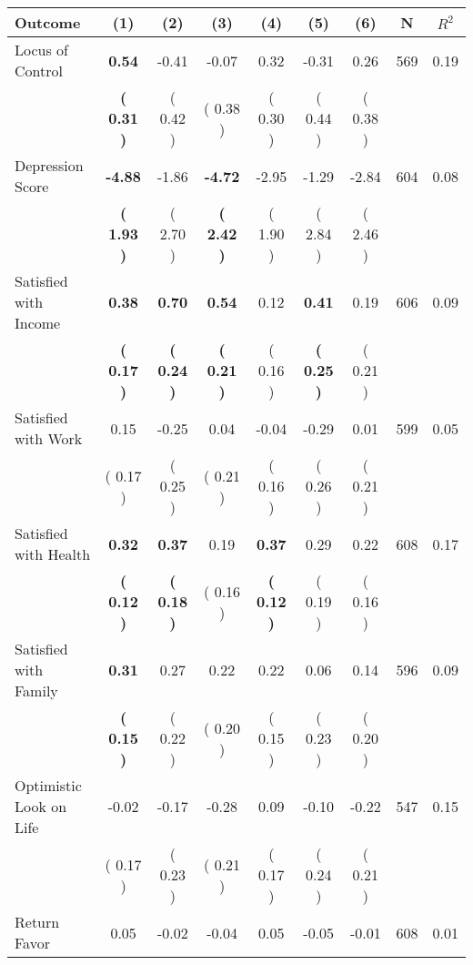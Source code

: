 \begin{tabular}{lcccccccc}
\toprule
 \textbf{Outcome} & \textbf{(1)} & \textbf{(2)} & \textbf{(3)} & \textbf{(4)} & \textbf{(5)} & \textbf{(6)} & \textbf{N} & \textbf{$ R^2$} \\
\midrule
Locus of Control & \textbf{     0.54} &     -0.41 &     -0.07 &      0.32 &     -0.31 &      0.26 & 569 &       0.19 \\ 
 & \textbf{(     0.31 )} & (     0.42 ) & (     0.38 ) & (     0.30 ) & (     0.44 ) & (     0.38 ) & \\
Depression Score & \textbf{    -4.88} &     -1.86 & \textbf{    -4.72} &     -2.95 &     -1.29 &     -2.84 & 604 &       0.08 \\ 
 & \textbf{(     1.93 )} & (     2.70 ) & \textbf{(     2.42 )} & (     1.90 ) & (     2.84 ) & (     2.46 ) & \\
Satisfied with Income & \textbf{     0.38} & \textbf{     0.70} & \textbf{     0.54} &      0.12 & \textbf{     0.41} &      0.19 & 606 &       0.09 \\ 
 & \textbf{(     0.17 )} & \textbf{(     0.24 )} & \textbf{(     0.21 )} & (     0.16 ) & \textbf{(     0.25 )} & (     0.21 ) & \\
Satisfied with Work &      0.15 &     -0.25 &      0.04 &     -0.04 &     -0.29 &      0.01 & 599 &       0.05 \\ 
 & (     0.17 ) & (     0.25 ) & (     0.21 ) & (     0.16 ) & (     0.26 ) & (     0.21 ) & \\
Satisfied with Health & \textbf{     0.32} & \textbf{     0.37} &      0.19 & \textbf{     0.37} &      0.29 &      0.22 & 608 &       0.17 \\ 
 & \textbf{(     0.12 )} & \textbf{(     0.18 )} & (     0.16 ) & \textbf{(     0.12 )} & (     0.19 ) & (     0.16 ) & \\
Satisfied with Family & \textbf{     0.31} &      0.27 &      0.22 &      0.22 &      0.06 &      0.14 & 596 &       0.09 \\ 
 & \textbf{(     0.15 )} & (     0.22 ) & (     0.20 ) & (     0.15 ) & (     0.23 ) & (     0.20 ) & \\
Optimistic Look on Life &     -0.02 &     -0.17 &     -0.28 &      0.09 &     -0.10 &     -0.22 & 547 &       0.15 \\ 
 & (     0.17 ) & (     0.23 ) & (     0.21 ) & (     0.17 ) & (     0.24 ) & (     0.21 ) & \\
Return Favor &      0.05 &     -0.02 &     -0.04 &      0.05 &     -0.05 &     -0.01 & 608 &       0.01 \\ 

\end{tabular}
